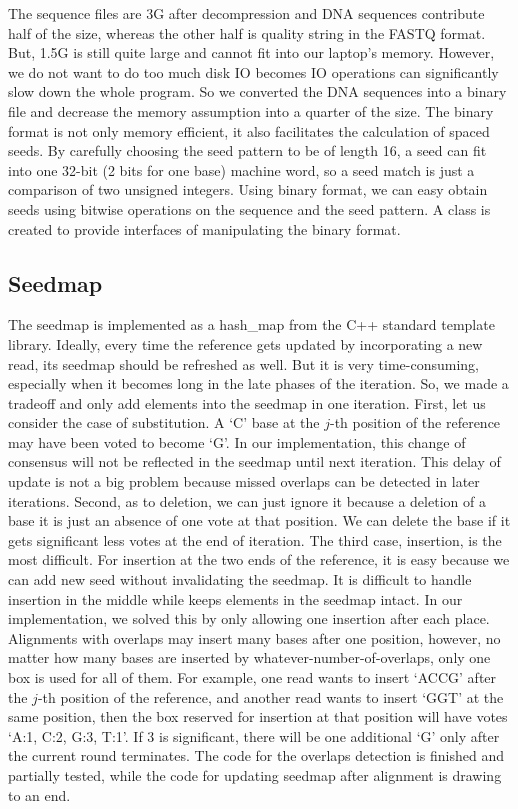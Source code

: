 \documentclass{article}
\begin{document}
The sequence files are 3G after decompression and DNA sequences contribute half
of the size, whereas the other half is quality string in the FASTQ format.  But,
   1.5G is still quite large and cannot fit into our laptop's memory.  However,
   we do not want to do too much disk IO becomes IO operations can significantly
   slow down the whole program. So we converted the DNA sequences into a binary
   file and decrease the memory assumption into a quarter of the size. The
   binary format is not only memory efficient, it also facilitates the
   calculation of spaced seeds. By carefully choosing the seed pattern to be of
   length 16, a seed can fit into one 32-bit (2 bits for one base) machine word,
   so a seed match is just a comparison of two unsigned integers. Using binary
   format, we can easy obtain seeds using bitwise operations on the sequence and
   the seed pattern. A class is created to provide interfaces of manipulating
   the binary format.

\subsection{Seedmap}

The seedmap is implemented as a hash\_map from the C++ standard template
library. Ideally, every time the reference gets updated by incorporating a new
read, its seedmap should be refreshed as well. But it is very time-consuming,
  especially when it becomes long in the late phases of the iteration. So, we
  made a tradeoff and only add elements into the seedmap in one iteration.
  First, let us consider the case of substitution. A `C' base at the $j$-th
  position of the reference may have been voted to become `G'. In our
  implementation, this change of consensus will not be reflected in the seedmap
  until next iteration.  This delay of update is not a big problem because
  missed overlaps can be detected in later iterations. Second, as to deletion,
  we can just ignore it because a deletion of a base it is just an absence of
  one vote at that position. We can delete the base if it gets significant less
  votes at the end of iteration. The third case, insertion, is the most
  difficult. For insertion at the two ends of the reference, it is easy because
  we can add new seed without invalidating the seedmap. It is difficult to
  handle insertion in the middle while keeps elements in the seedmap intact. In
  our implementation, we solved this by only allowing one insertion after each
  place. Alignments with overlaps may insert many bases after one position,
  however, no matter how many bases are inserted by whatever-number-of-overlaps,
  only one box is used for all of them.  For example, one read wants to insert
  `ACCG' after the $j$-th position of the reference, and another read wants to
  insert `GGT' at the same position, then the box reserved for insertion at that
  position will have votes `A:1, C:2, G:3, T:1'. If 3 is significant, there will
  be one additional `G' only after the current round terminates. The code for
  the overlaps detection is finished and partially tested, while the code for
  updating seedmap after alignment is drawing to an end.
\end{document}
